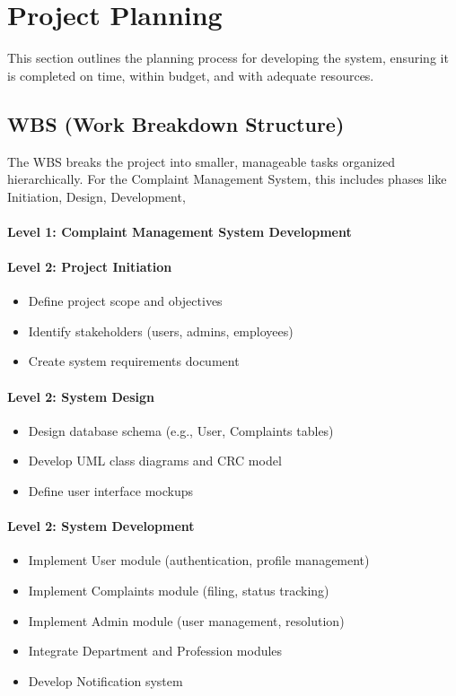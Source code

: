 \documentclass[a4paper,12pt]{article}
\begin{document}
\section{Project Planning}
This section outlines the planning process for developing the system, ensuring it is completed on time, within budget, and with adequate resources.

\subsection{WBS (Work Breakdown Structure)}
The WBS breaks the project into smaller, manageable tasks organized hierarchically. For the Complaint Management System, this includes phases like Initiation, Design, Development,

\paragraph*{Level 1: Complaint Management System Development}

\paragraph*{Level 2: Project Initiation}
\begin{itemize}
    \item Define project scope and objectives
    \item Identify stakeholders (users, admins, employees)
    \item Create system requirements document
\end{itemize}

\paragraph*{Level 2: System Design}
\begin{itemize}
    \item Design database schema (e.g., User, Complaints tables)
    \item Develop UML class diagrams and CRC model
    \item Define user interface mockups
\end{itemize}

\paragraph*{Level 2: System Development}
\begin{itemize}
    \item Implement User module (authentication, profile management)
    \item Implement Complaints module (filing, status tracking)
    \item Implement Admin module (user management, resolution)
    \item Integrate Department and Profession modules
    \item Develop Notification system
\end{itemize}
\end{document}
